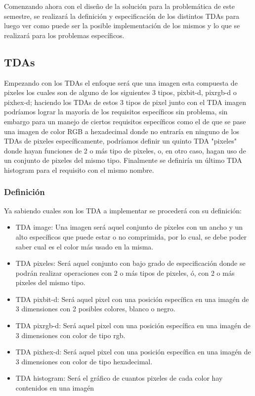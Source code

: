 Comenzando ahora con el diseño de la solución para la problemática de este semestre, se realizará la definición y especificación
de los distintos TDAs para luego ver como puede ser la posible implementación de los mismos y lo que se realizará para los problemas
específicos.

\subsection{TDAs}
 Empezando con los TDAs el enfoque será que una imagen esta compuesta de pixeles los cuales
  son de alguno de los siguientes 3 tipos, pixbit-d, pixrgb-d o pixhex-d; haciendo los TDAs de estos 3 tipos
  de pixel junto con el TDA imagen podríamos lograr la mayoría de los requisitos específicos sin problema, sin 
  embargo para un manejo de ciertos requisitos específicos como el de que se pase una imagen de color RGB a hexadecimal
  donde no entraría en ninguno de los TDAs de pixeles específicamente, podríamos definir un quinto TDA "pixeles" donde hayan
  funciones de 2 o más tipo de pixeles, o, en otro caso, hagan uso de un conjunto de pixeles del mismo tipo. Finalmente se definiría
  un último TDA histogram para el requisito con el mismo nombre.\\

  \subsubsection{Definición}
    Ya sabiendo cuales son los TDA a implementar se procederá con su definición:
    \begin{itemize}
      \item TDA image: Una imagen será aquel conjunto de pixeles con un ancho y un alto específicos
        que puede estar o no comprimida, por lo cual, se debe poder saber cual es el color más usado en la misma.
      \item TDA pixeles: Será aquel conjunto con bajo grado de especificación donde se podrán realizar operaciones con 2 o más tipos de pixeles, ó,
        con 2 o más pixeles del mismo tipo.
      \item TDA pixbit-d: Será aquel pixel con una posición específica en una imagén de 3 dimensiones con 2 posibles colores, blanco o negro.
      \item TDA pixrgb-d: Será aquel pixel con una posición específica en una imagén de 3 dimensiones con color de tipo rgb.
      \item TDA pixhex-d: Será aquel pixel con una posición específica en una imagén de 3 dimensiones con color de tipo hexadecimal.
      \item TDA histogram: Será el gráfico de cuantos pixeles de cada color hay contenidos en una imagén
    \end{itemize}

